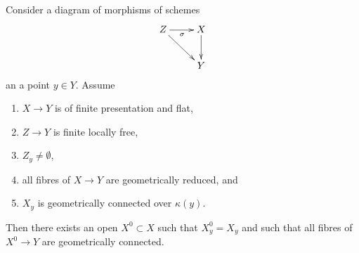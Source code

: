 \begin{lemma}
\label{lemma-descent-connected-fibres}
Consider a diagram of morphisms of schemes
$$
\xymatrix{
Z \ar[r]_{\sigma} \ar[rd] & X \ar[d] \\
& Y
}
$$
an a point $y \in Y$. Assume
\begin{enumerate}
\item $X \to Y$ is of finite presentation and flat,
\item $Z \to Y$ is finite locally free,
\item $Z_y \not = \emptyset$,
\item all fibres of $X \to Y$ are geometrically reduced, and
\item $X_y$ is geometrically connected over $\kappa(y)$.
\end{enumerate}
Then there exists an open $X^0 \subset X$ such that $X^0_y = X_y$
and such that all fibres of $X^0 \to Y$ are geometrically connected.
\end{lemma}

